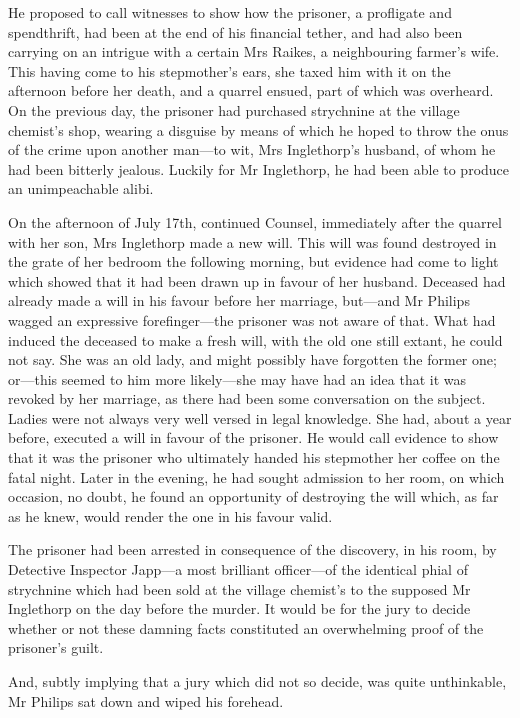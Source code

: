  He proposed to call witnesses to show how the prisoner, a profligate and spendthrift, had been at the end of his financial tether, and had also been carrying on an intrigue with a certain Mrs Raikes, a neighbouring farmer's wife. This having come to his stepmother's ears, she taxed him with it on the afternoon before her death, and a quarrel ensued, part of which was overheard. On the previous day, the prisoner had purchased strychnine at the village chemist's shop, wearing a disguise by means of which he hoped to throw the onus of the crime upon another man—to wit, Mrs Inglethorp's husband, of whom he had been bitterly jealous. Luckily for Mr Inglethorp, he had been able to produce an unimpeachable alibi. 

 On the afternoon of July 17th, continued Counsel, immediately after the quarrel with her son, Mrs Inglethorp made a new will. This will was found destroyed in the grate of her bedroom the following morning, but evidence had come to light which showed that it had been drawn up in favour of her husband. Deceased had already made a will in his favour before her marriage, but—and Mr Philips wagged an expressive forefinger—the prisoner was not aware of that. What had induced the deceased to make a fresh will, with the old one still extant, he could not say. She was an old lady, and might possibly have forgotten the former one; or—this seemed to him more likely—she may have had an idea that it was revoked by her marriage, as there had been some conversation on the subject. Ladies were not always very well versed in legal knowledge. She had, about a year before, executed a will in favour of the prisoner. He would call evidence to show that it was the prisoner who ultimately handed his stepmother her coffee on the fatal night. Later in the evening, he had sought admission to her room, on which occasion, no doubt, he found an opportunity of destroying the will which, as far as he knew, would render the one in his favour valid. 

 The prisoner had been arrested in consequence of the discovery, in his room, by Detective Inspector Japp—a most brilliant officer—of the identical phial of strychnine which had been sold at the village chemist's to the supposed Mr Inglethorp on the day before the murder. It would be for the jury to decide whether or not these damning facts constituted an overwhelming proof of the prisoner's guilt. 

 And, subtly implying that a jury which did not so decide, was quite unthinkable, Mr Philips sat down and wiped his forehead. 

